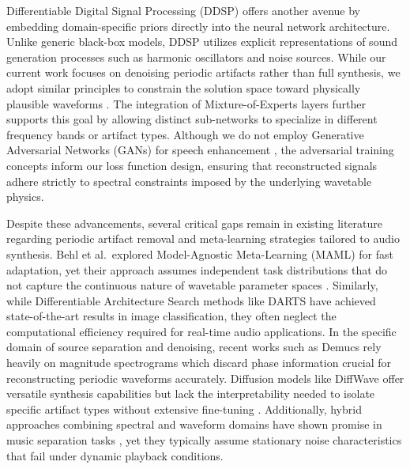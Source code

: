 Differentiable Digital Signal Processing (DDSP) offers another avenue by embedding domain-specific priors directly into the neural network architecture\cite{engel2020}. Unlike generic black-box models, DDSP utilizes explicit representations of sound generation processes such as harmonic oscillators and noise sources. While our current work focuses on denoising periodic artifacts rather than full synthesis, we adopt similar principles to constrain the solution space toward physically plausible waveforms \cite{stoller2018}. The integration of Mixture-of-Experts layers\cite{shazeer2017} further supports this goal by allowing distinct sub-networks to specialize in different frequency bands or artifact types. Although we do not employ Generative Adversarial Networks (GANs) for speech enhancement \cite{pascual2017}, the adversarial training concepts inform our loss function design, ensuring that reconstructed signals adhere strictly to spectral constraints imposed by the underlying wavetable physics.

Despite these advancements, several critical gaps remain in existing literature regarding periodic artifact removal and meta-learning strategies tailored to audio synthesis. Behl et al.\ explored Model-Agnostic Meta-Learning (MAML) for fast adaptation\cite{finn2017}, yet their approach assumes independent task distributions that do not capture the continuous nature of wavetable parameter spaces \cite{jaderberg2017}. Similarly, while Differentiable Architecture Search methods like DARTS have achieved state-of-the-art results in image classification\cite{liu2019}, they often neglect the computational efficiency required for real-time audio applications. In the specific domain of source separation and denoising, recent works such as Demucs \cite{dfossez2019} rely heavily on magnitude spectrograms which discard phase information crucial for reconstructing periodic waveforms accurately\cite{stoller2018}. Diffusion models like DiffWave offer versatile synthesis capabilities but lack the interpretability needed to isolate specific artifact types without extensive fine-tuning \cite{kong2021}. Additionally, hybrid approaches combining spectral and waveform domains have shown promise in music separation tasks \cite{dfossez2021}, yet they typically assume stationary noise characteristics that fail under dynamic playback conditions.

